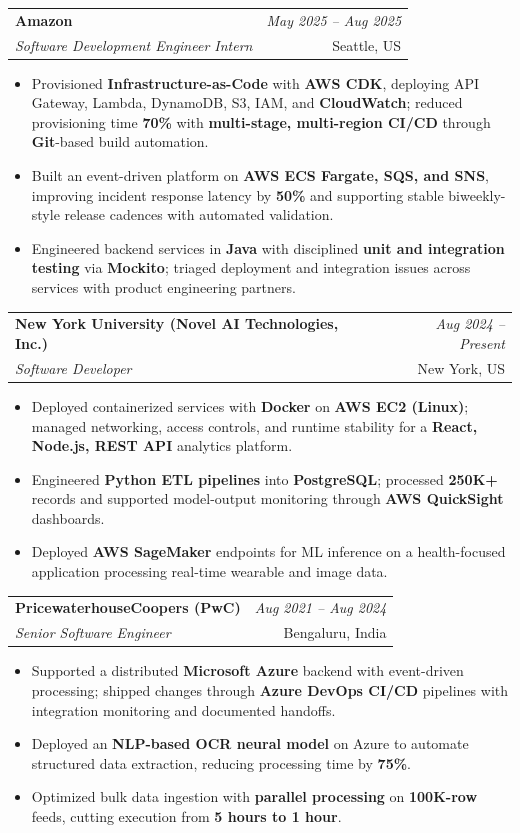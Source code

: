 \documentclass[a4paper,10pt]{article}
\makeatletter
\newcommand{\resumeSubheading}[4]{
\vspace{0.3mm}\item
    \begin{tabular*}{0.98\textwidth}[t]{l@{\extracolsep{\fill}}r}
        \textbf{#1} & \textit{\footnotesize{#4}} \\
        \textit{\footnotesize{#3}} & \footnotesize{#2}\\
    \end{tabular*}\vspace{-2mm}
}
\newcommand{\resumeItemListStart}{\begin{itemize}[leftmargin=*, labelsep=1mm, itemsep=0pt]}
\newcommand{\resumeItemListEnd}{\end{itemize}\vspace{-2mm}}
\makeatother
\begin{document}
\resumeSubheading
{Amazon}{Seattle, US}
{Software Development Engineer Intern}{May 2025 -- Aug 2025}
\resumeItemListStart
\item \footnotesize{Provisioned \textbf{Infrastructure-as-Code} with \textbf{AWS CDK}, deploying API Gateway, Lambda, DynamoDB, S3, IAM, and \textbf{CloudWatch}; reduced provisioning time \textbf{70\%} with \textbf{multi-stage, multi-region CI/CD} through \textbf{Git}-based build automation.}
\item \footnotesize{Built an event-driven platform on \textbf{AWS ECS Fargate, SQS, and SNS}, improving incident response latency by \textbf{50\%} and supporting stable biweekly-style release cadences with automated validation.}
\item \footnotesize{Engineered backend services in \textbf{Java} with disciplined \textbf{unit and integration testing} via \textbf{Mockito}; triaged deployment and integration issues across services with product engineering partners.}
\resumeItemListEnd

\resumeSubheading
{New York University (Novel AI Technologies, Inc.)}{New York, US}
{Software Developer}{Aug 2024 -- Present}
\resumeItemListStart
\item \footnotesize{Deployed containerized services with \textbf{Docker} on \textbf{AWS EC2 (Linux)}; managed networking, access controls, and runtime stability for a \textbf{React, Node.js, REST API} analytics platform.}
\item \footnotesize{Engineered \textbf{Python ETL pipelines} into \textbf{PostgreSQL}; processed \textbf{250K+} records and supported model-output monitoring through \textbf{AWS QuickSight} dashboards.}
\item \footnotesize{Deployed \textbf{AWS SageMaker} endpoints for ML inference on a health-focused application processing real-time wearable and image data.}
\resumeItemListEnd

\resumeSubheading
{PricewaterhouseCoopers (PwC)}{Bengaluru, India}
{Senior Software Engineer}{Aug 2021 -- Aug 2024}
\resumeItemListStart
\item \footnotesize{Supported a distributed \textbf{Microsoft Azure} backend with event-driven processing; shipped changes through \textbf{Azure DevOps CI/CD} pipelines with integration monitoring and documented handoffs.}
\item \footnotesize{Deployed an \textbf{NLP-based OCR neural model} on Azure to automate structured data extraction, reducing processing time by \textbf{75\%}.}
\item \footnotesize{Optimized bulk data ingestion with \textbf{parallel processing} on \textbf{100K-row} feeds, cutting execution from \textbf{5 hours to 1 hour}.}
\resumeItemListEnd
\end{document}
